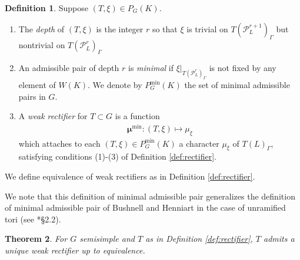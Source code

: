 \documentclass{amsart}
\theoremstyle{plain}
\newtheorem{theorem}{Theorem}[section]
\theoremstyle{definition}
\newtheorem{definition}[theorem]{Definition}
\numberwithin{equation}{section}
\newcommand{\PL}{\mathcal{P}_L}
\newcommand{\Pmin}{P_G^{\min}}
\newcommand{\bmu}{\boldsymbol\mu}
\newcommand{\mumin}{\bmu^{\min}}
\begin{document}
\begin{definition}\label{def:general_pair}
Suppose $(T, \xi) \in P_G(K)$.
\begin{enumerate}
\item The \emph{depth} of $(T, \xi)$ is the integer $r$ so that $\xi$
is trivial on $T(\PL^{r+1})_{\Gamma}$ but nontrivial on
$T(\PL^{r})_{\Gamma}$
\item An admissible pair of depth $r$ is \emph{minimal}
if $\xi|_{T(\PL^{r})_{\Gamma}}$
is not fixed by any element of $W(K)$.
We denote by $\Pmin(K)$ the set
of minimal admissible pairs in $G$.
\item A \emph{weak rectifier} for $T \subset G$ is a function
\begin{align*}
\mumin : (T, \xi) \mapsto \mu_{\xi}
\end{align*}
which attaches to each $(T, \xi) \in \Pmin(K)$ a character
  $\mu_{\xi}$ of $T(L)_{\Gamma}$, satisfying conditions (1)-(3)
  of Definition \ref{def:rectifier}.
\end{enumerate}
We define equivalence of weak rectifiers as in Definition \ref{def:rectifier}.
\end{definition}

We note that this definition of minimal admissible pair generalizes
the definition of minimal admissible pair of Bushnell and Henniart in
the case of unramified tori (see \cite{bushnell-henniart:05a}*{\S2.2}).

\begin{theorem} \label{thm:unique_semisimple}
For $G$ semisimple and $T$ as in Definition \ref{def:rectifier}, $T$ admits a unique weak rectifier up to equivalence.
\end{theorem}
\end{document}
